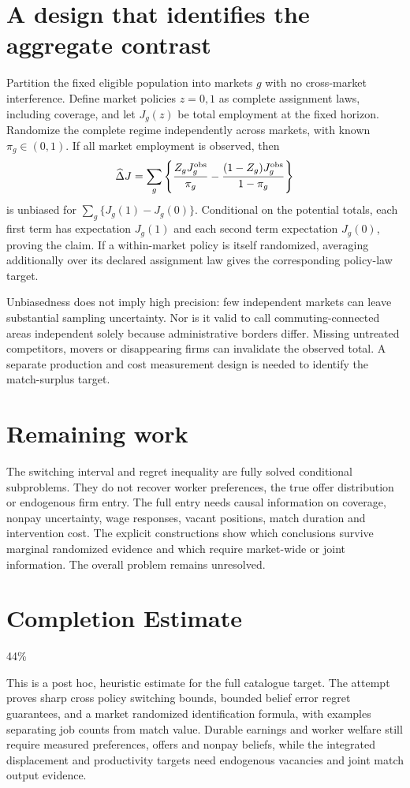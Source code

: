 \documentclass[11pt]{article}
\begin{document}
\section*{A design that identifies the aggregate contrast}
Partition the fixed eligible population into markets $g$ with no cross-market interference. Define market policies $z=0,1$ as complete assignment laws, including coverage, and let $J_g(z)$ be total employment at the fixed horizon. Randomize the complete regime independently across markets, with known $\pi_g\in(0,1)$. If all market employment is observed, then
\[
 \widehat\Delta J=\sum_g\left\{
 \frac{Z_gJ_g^{\rm obs}}{\pi_g}
 -\frac{(1-Z_g)J_g^{\rm obs}}{1-\pi_g}\right\}
\]
is unbiased for $\sum_g\{J_g(1)-J_g(0)\}$. Conditional on the potential totals, each first term has expectation $J_g(1)$ and each second term expectation $J_g(0)$, proving the claim. If a within-market policy is itself randomized, averaging additionally over its declared assignment law gives the corresponding policy-law target.

Unbiasedness does not imply high precision: few independent markets can leave substantial sampling uncertainty. Nor is it valid to call commuting-connected areas independent solely because administrative borders differ. Missing untreated competitors, movers or disappearing firms can invalidate the observed total. A separate production and cost measurement design is needed to identify the match-surplus target.

\section*{Remaining work}
The switching interval and regret inequality are fully solved conditional subproblems. They do not recover worker preferences, the true offer distribution or endogenous firm entry. The full entry needs causal information on coverage, nonpay uncertainty, wage responses, vacant positions, match duration and intervention cost. The explicit constructions show which conclusions survive marginal randomized evidence and which require market-wide or joint information. The overall problem remains unresolved.

\section{Completion Estimate}
44\%

This is a post hoc, heuristic estimate for the full catalogue target.
The attempt proves sharp cross policy switching bounds, bounded belief error regret guarantees, and a market randomized identification formula, with examples separating job counts from match value. Durable earnings and worker welfare still require measured preferences, offers and nonpay beliefs, while the integrated displacement and productivity targets need endogenous vacancies and joint match output evidence.
\end{document}
